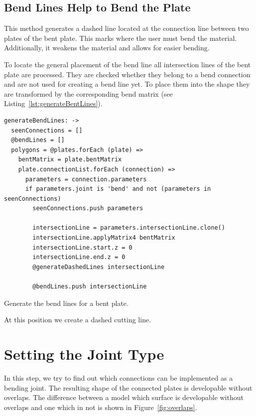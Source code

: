 \documentclass[../ClassicThesis.tex]{subfiles}
\begin{document}
\subsection{Bend Lines Help to Bend the Plate}
\label{sec:generateBendLines}

This method generates a dashed line located at the connection line between two plates of the bent plate. This marks where the user must bend the material. Additionally, it weakens the material and allows for easier bending.

To locate the general placement of the bend line all intersection lines of the bent plate are processed. They are checked whether they belong to a bend connection and are not used for creating a bend line yet. To place them into the shape they are transformed by the corresponding bend matrix (see Listing~\ref{lst:generateBentLines}).

\begin{listing}[ht]
\begin{verbatim}
generateBendLines: ->
  seenConnections = []
  @bendLines = []
  polygons = @plates.forEach (plate) =>
    bentMatrix = plate.bentMatrix
    plate.connectionList.forEach (connection) =>
      parameters = connection.parameters
      if parameters.joint is 'bend' and not (parameters in seenConnections)
        seenConnections.push parameters

        intersectionLine = parameters.intersectionLine.clone()
        intersectionLine.applyMatrix4 bentMatrix
        intersectionLine.start.z = 0
        intersectionLine.end.z = 0
        @generateDashedLines intersectionLine

        @bendLines.push intersectionLine
\end{verbatim}
\caption{Generate the bend lines for a bent plate.}
\label{lst:bend-matrix}
\end{listing}

At this position we create a dashed cutting line.

\section{Setting the Joint Type}

In this step, we try to find out which connections can be implemented as a bending joint. The resulting shape of the connected plates is developable without overlaps. The difference between a model which surface is developable without overlaps and one which in not is shown in Figure~\ref{fig:overlaps}.
\end{document}

